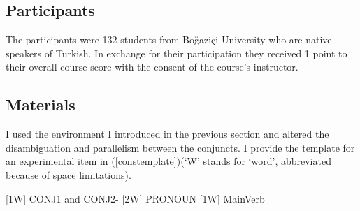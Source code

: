 








\subsection{Participants}
The participants were 132 students from Boğaziçi University who are native speakers of Turkish. In exchange for their participation they received 1 point to their overall course score with the consent of the course's instructor.

\subsection{Materials}

I used the environment I introduced in the previous section and altered the disambiguation and parallelism between the conjuncts. I provide the template for an experimental item in (\ref{constemplate})(`W' stands for `word', abbreviated because of space limitations).

\begin{exe}
\ex \label{constemplate}
[1W] CONJ1 and CONJ2-{\Case} [2W] PRONOUN [1W] MainVerb
\end{exe}

